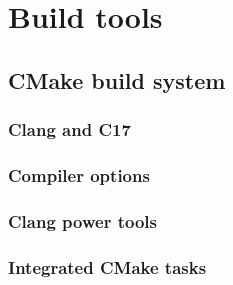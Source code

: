 \section{Build tools}

\subsection{CMake build system}
\subsubsection{Clang and C17}
\subsubsection{Compiler options}
\subsubsection{Clang power tools}
\subsubsection{Integrated CMake tasks}
